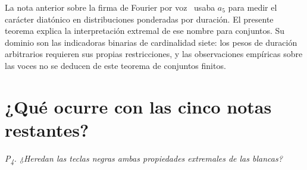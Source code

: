 \documentclass[11pt]{article}
\newcommand{\question}[1]{\smallskip\noindent\textit{#1}\smallskip}
\begin{document}
La nota anterior sobre la firma de Fourier por voz~\cite{Voice} usaba $a_5$ para medir
el carácter diatónico en distribuciones ponderadas por duración. El presente teorema
explica la interpretación extremal de ese nombre para conjuntos. Su dominio son las
indicadoras binarias de cardinalidad siete: los pesos de duración arbitrarios requieren
sus propias restricciones, y las observaciones empíricas sobre las voces no se deducen
de este teorema de conjuntos finitos.

\section{¿Qué ocurre con las cinco notas restantes?}\label{sec:complements}

\question{P\textsubscript{4}. ¿Heredan las teclas negras ambas propiedades extremales de las blancas?}
\end{document}
